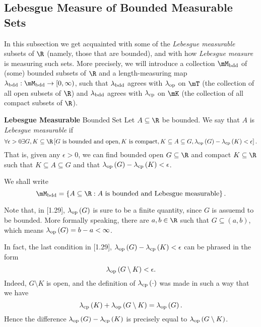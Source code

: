 \documentclass[pmath450]{subfiles}
\begin{document}
    \subsection{Lebesgue Measure of Bounded Measurable Sets}

    In this subsection we get acquainted with some of the \textit{Lebesgue measurable} subsets of $\R$ (namely, those that are bounded), and with how \textit{Lebesgue measure} is measuring such sets. More precisely, we will introduce a collection $\mM_{\bdd}$ of (some) bounded subsets of $\R$ and a length-measuring map $\lambda_{\bdd}:\mM_{\bdd}\to\left[ 0,\infty \right)$, such that $\lambda_{\operatorname{bdd}}$ agrees with $\lambda_{\operatorname{op}}$ on $\mT$ (the collection of all open subsets of $\R$) and $\lambda_{\operatorname{bdd}}$ agrees with $\lambda_{\operatorname{cp}}$ on $\mK$ (the collection of all compact subsets of $\R$).

    \begin{definition}{\textbf{Lebesgue Measurable} Bounded Set}
        Let $A\subseteq\R$ be bounded. We say that $A$ is \emph{Lebesgue measurable} if
        \begin{equation}
            \forall\epsilon>0\exists G,K\subseteq\R\left[ G\text{ is bounded and open}, K\text{ is compact}, K\subseteq A\subseteq G, \lambda_{\op}\left( G \right)-\lambda_{\cp}\left( K \right)<\epsilon \right].
        \end{equation}
        That is, given any $\epsilon>0$, we can find bounded open $G\subseteq\R$ and compact $K\subseteq\R$ such that $K\subseteq A\subseteq G$ and that $\lambda_{\operatorname{op}}\left( G \right)-\lambda_{\operatorname{cp}}\left( K \right)<\epsilon$.

        We shall write
        \begin{equation*}
            \mM_{\bdd} = \left\lbrace A\subseteq\R:A\text{ is bounded and Lebesgue measurable} \right\rbrace.
        \end{equation*}
    \end{definition}
    
    \np Note that, in [1.29], $\lambda_{\operatorname{op}}\left( G \right)$ is sure to be a finite quantity, since $G$ is assuemd to be bounded. More formally speaking, there are $a,b\in\R$ such that $G\subseteq\left( a,b \right)$, which means $\lambda_{\operatorname{op}}\left( G \right)=b-a<\infty$.

    \np In fact, the last condition in [1.29], $\lambda_{\operatorname{op}}\left( G \right)-\lambda_{\operatorname{cp}}\left( K \right)<\epsilon$ can be phrased in the form
    \begin{equation}
        \lambda_{\operatorname{op}}\left( G\setminus K \right)<\epsilon.
    \end{equation}
    Indeed, $G\setminus K$ is open, and the definition of $\lambda_{\operatorname{cp}}\left( \cdot \right)$ was made in such a way that we have
    \begin{equation*}
        \lambda_{\operatorname{cp}}\left( K \right)+\lambda_{\operatorname{op}}\left( G\setminus K \right)=\lambda_{\operatorname{op}}\left( G \right).
    \end{equation*}
    Hence the difference $\lambda_{\operatorname{op}}\left( G \right)-\lambda_{\operatorname{cp}}\left( K \right)$ is precisely equal to $\lambda_{\operatorname{op}}\left( G\setminus K \right)$.
\end{document}
